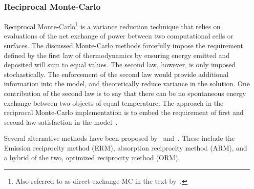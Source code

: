 \subsubsection{Reciprocal Monte-Carlo}
Reciprocal Monte-Carlo\footnote{Also referred to as direct-exchange MC in the text by~\citet{Modest2013RadiativeTransfer}.} is a variance reduction technique that relies on evaluations of the net exchange of power between two computational cells or surfaces.
The discussed Monte-Carlo methods forcefully impose the requirement defined by the first law of thermodynamics by ensuring energy emitted and deposited will sum to equal values. The second law, however, is only imposed stochastically.
The enforcement of the second law would provide additional information into the model, and theoretically reduce variance in the solution. One contribution of the second law is to say that there can be no spontaneous energy exchange between two objects of equal temperature. 
The approach in the reciprocal Monte-Carlo implementation is to embed the requirement of first and second law satisfaction in the model~\cite{Howell2020ThermalTransfer}.

Several alternative methods have been proposed by~\citet{Tesse2002RadiativeApproach} and~\citet{Dupoirieux2006AnThicknesses}. These include the Emission reciprocity method (ERM), absorption reciprocity method (ARM), and a hybrid of the two, optimized reciprocity method (ORM).

